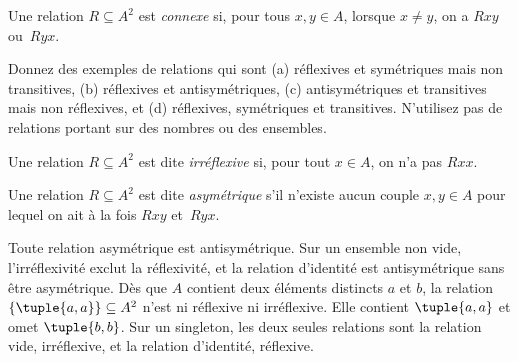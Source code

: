 \documentclass[../../../include/open-logic-section]{subfiles}
\begin{document}
\begin{defn}[Connexité]
Une relation $R \subseteq A^2$ est \emph{connexe} si, pour tous $x,y\in A$,
lorsque $x \neq y$, on a $Rxy$ ou~$Ryx$.
\end{defn}

\begin{prob}
Donnez des exemples de relations qui sont (a) réflexives et symétriques
mais non transitives, (b) réflexives et antisymétriques,
(c) antisymétriques et transitives mais non réflexives, et
(d) réflexives, symétriques et transitives. N’utilisez pas de relations
portant sur des nombres ou des ensembles.
\end{prob}

\begin{defn}[Irréflexivité]
Une relation $R \subseteq A^2$ est dite \emph{irréflexive} si,
pour tout $x \in A$, on n’a pas $Rxx$.
\end{defn}

\begin{defn}[Asymétrie]
Une relation $R \subseteq A^2$ est dite \emph{asymétrique} s’il n’existe
aucun couple $x,y\in A$ pour lequel on ait à la fois $Rxy$ et~$Ryx$.
\end{defn}

Toute relation asymétrique est antisymétrique. Sur un ensemble
non vide, l'irréflexivité exclut la réflexivité, et la relation
d'identité est antisymétrique sans être asymétrique.
Dès que $A$ contient deux éléments distincts $a$ et $b$,
la relation $\{\tuple{a,a}\}\subseteq A^2$ n'est ni réflexive
ni irréflexive. Elle contient $\tuple{a,a}$ et omet $\tuple{b,b}$.
Sur un singleton, les deux seules relations sont la relation
vide, irréflexive, et la relation d'identité, réflexive.
%
\end{document}
